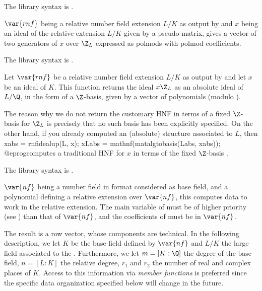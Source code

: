 The library syntax is .

\label{se:rnfidealtwoelt}
$\var{rnf}$ being a relative
number field extension $L/K$ as output by  and $x$ being an
ideal of the relative extension $L/K$ given by a pseudo-matrix, gives a
vector of two generators of $x$ over $\Z_L$ expressed as polmods with polmod
coefficients.

The library syntax is .

\label{se:rnfidealup}
Let $\var{rnf}$ be a relative number
field extension $L/K$ as output by  and let $x$ be an ideal of
$K$. This function returns the ideal $x\Z_L$ as an absolute ideal of $L/\Q$,
in the form of a $\Z$-basis, given by a vector of polynomials (modulo
).

The reason why we do not return the customary HNF in terms of a fixed
$\Z$-basis for $\Z_L$ is precisely that no such basis has been explicitly
specified. On the other hand, if you already computed an (absolute) 
structure  associated to $L$, then
\bprog
  xabs = rnfidealup(L, x);
  xLabs = mathnf(matalgtobasis(Labs, xabs));
@eprog\noindent computes a traditional HNF  for $x$ in terms of
the fixed $\Z$-basis .

The library syntax is .

\label{se:rnfinit}
$\var{nf}$ being a number field in 
format considered as base field, and  a polynomial defining a relative
extension over $\var{nf}$, this computes data to work in the
relative extension. The main variable of  must be of higher priority
(see ) than that of $\var{nf}$, and the coefficients of
 must be in $\var{nf}$.

The result is a row vector, whose components are technical. In the following
description, we let $K$ be the base field defined by $\var{nf}$ and $L/K$
the large field associated to the . Furthermore, we let
$m = [K:\Q]$ the degree of the base field, $n = [L:K]$ the relative degree,
$r_1$ and $r_2$ the number of real and complex places of $K$. Access to this
information via \emph{member functions} is preferred since the specific
data organization specified below will change in the future.

